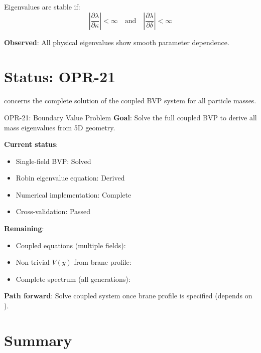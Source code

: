 Eigenvalues are stable if:
\begin{equation}
\left|\frac{\partial \lambda}{\partial \kappa}\right| < \infty
\quad \text{and} \quad
\left|\frac{\partial \lambda}{\partial \delta}\right| < \infty
\end{equation}

\textbf{Observed}: All physical eigenvalues show smooth parameter dependence.

\section{Status: OPR-21}
\label{sec:opr21}

 concerns the complete solution of the coupled BVP system
for all particle masses.

\begin{statusbox}{OPR-21: Boundary Value Problem}
\textbf{Goal}: Solve the full coupled BVP to derive all mass eigenvalues
from 5D geometry.

\textbf{Current status}:
\begin{itemize}[nosep]
\item Single-field BVP: Solved \tagDer
\item Robin eigenvalue equation: Derived \tagDer
\item Numerical implementation: Complete
\item Cross-validation: Passed
\end{itemize}

\textbf{Remaining}:
\begin{itemize}[nosep]
\item Coupled equations (multiple fields): \tagOpen
\item Non-trivial $V(y)$ from brane profile: \tagOpen
\item Complete spectrum (all generations): \tagOpen
\end{itemize}

\textbf{Path forward}:
Solve coupled system once brane profile is specified (depends on ).
\end{statusbox}

\section{Summary}
\label{sec:bvp_summary}

